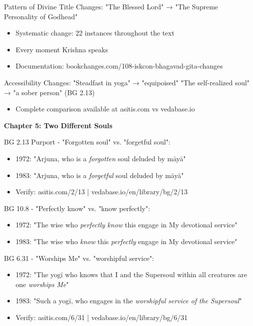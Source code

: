 \documentclass[12pt,twoside]{book}
\begin{document}
Pattern of Divine Title Changes:
"The Blessed Lord" → "The Supreme Personality of Godhead"
\begin{itemize}
\item Systematic change: 22 instances throughout the text
\item Every moment Krishna speaks
\item Documentation: bookchanges.com/108-iskcon-bhagavad-gita-changes
\end{itemize}

Accessibility Changes:
"Steadfast in yoga" → "equipoised"
"The self-realized soul" → "a sober person" (BG 2.13)
\begin{itemize}
\item Complete comparison available at asitis.com vs vedabase.io
\end{itemize}

\vspace{0.5cm}

\textbf{\textbf{Chapter 5: Two Different Souls}}

BG 2.13 Purport - "Forgotten soul" vs. "forgetful soul":
\begin{itemize}
\item 1972: "Arjuna, who is a \emph{forgotten} soul deluded by māyā"
\item 1983: "Arjuna, who is a \emph{forgetful} soul deluded by māyā"
\item Verify: asitis.com/2/13 | vedabase.io/en/library/bg/2/13
\end{itemize}

BG 10.8 - "Perfectly know" vs. "know perfectly":
\begin{itemize}
\item 1972: "The wise who \emph{perfectly know} this engage in My devotional service"
\item 1983: "The wise who \emph{know} this \emph{perfectly} engage in My devotional service"
\end{itemize}

BG 6.31 - "Worships Me" vs. "worshipful service":
\begin{itemize}
\item 1972: "The yogī who knows that I and the Supersoul within all creatures are one \emph{worships Me}"
\item 1983: "Such a yogī, who engages in the \emph{worshipful service of the Supersoul}"
\item Verify: asitis.com/6/31 | vedabase.io/en/library/bg/6/31
\end{itemize}
\end{document}
